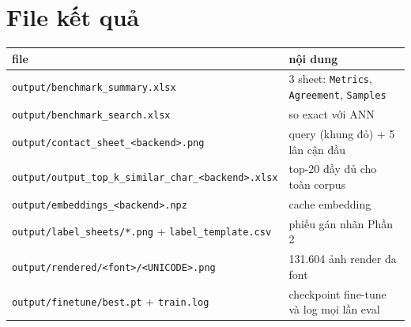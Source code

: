 \documentclass[11pt,a4paper]{article}
\newcommand{\code}[1]{\texttt{#1}}
\begin{document}
\section{File kết quả}

\begin{center}
\small
\begin{tabular}{ll}
\toprule
file & nội dung \\
\midrule
\code{output/benchmark\_summary.xlsx} & 3 sheet: \code{Metrics}, \code{Agreement}, \code{Samples} \\
\code{output/benchmark\_search.xlsx} & so exact với ANN \\
\code{output/contact\_sheet\_<backend>.png} & query (khung đỏ) + 5 lân cận đầu \\
\code{output/output\_top\_k\_similar\_char\_<backend>.xlsx} & top-20 đầy đủ cho toàn corpus \\
\code{output/embeddings\_<backend>.npz} & cache embedding \\
\code{output/label\_sheets/*.png} + \code{label\_template.csv} & phiếu gán nhãn Phần 2 \\
\code{output/rendered/<font>/<UNICODE>.png} & 131.604 ảnh render đa font \\
\code{output/finetune/best.pt} + \code{train.log} & checkpoint fine-tune và log mọi lần eval \\
\bottomrule
\end{tabular}
\end{center}
\end{document}
